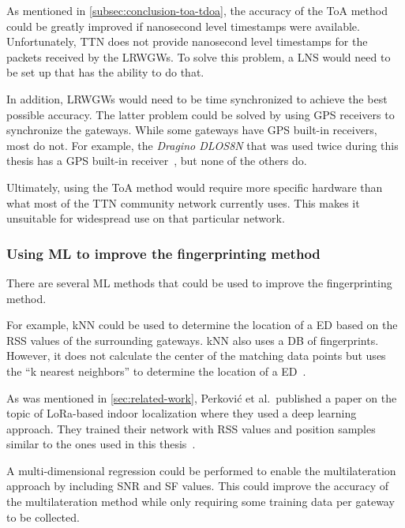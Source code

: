 As mentioned in \cref{subsec:conclusion-toa-tdoa}, the accuracy of the \ac{ToA} method could be greatly improved if nanosecond level timestamps were available.
Unfortunately, \ac{TTN} does not provide nanosecond level timestamps for the packets received by the \aclp{LRWGW}.
To solve this problem, a \ac{LNS} would need to be set up that has the ability to do that.

In addition, \aclp{LRWGW} would need to be time synchronized to achieve the best possible accuracy.
The latter problem could be solved by using \ac{GPS} receivers to synchronize the gateways.
While some gateways have \ac{GPS} built-in receivers, most do not.
For example, the \emph{Dragino DLOS8N} that was used twice during this thesis has a \ac{GPS} built-in receiver~\cite{dragino_technology_co_ltd_dlos8n_2023}, but none of the others do.

Ultimately, using the \ac{ToA} method would require more specific hardware than what most of the \ac{TTN} community network currently uses.
This makes it unsuitable for widespread use on that particular network.

\subsubsection{Using \acl{ML} to improve the fingerprinting method}

There are several \ac{ML} methods that could be used to improve the fingerprinting method.

For example, \ac{kNN} could be used to determine the location of a \acl{ED} based on the \ac{RSS} values of the surrounding gateways.
\ac{kNN} also uses a \ac{DB} of fingerprints.
However, it does not calculate the center of the matching data points but uses the ``k nearest neighbors'' to determine the location of a \acl{ED}~\cite{anagnostopoulos_reproducible_2019}.

As was mentioned in \cref{sec:related-work}, Perković et al.\ published a paper on the topic of \ac{LoRa}-based indoor localization where they used a deep learning approach.
They trained their network with \ac{RSS} values and position samples similar to the ones used in this thesis~\cite{perkovic_machine_2023}.

A multi-dimensional regression could be performed to enable the multilateration approach by including \ac{SNR} and \ac{SF} values.
This could improve the accuracy of the multilateration method while only requiring some training data per gateway to be collected.

